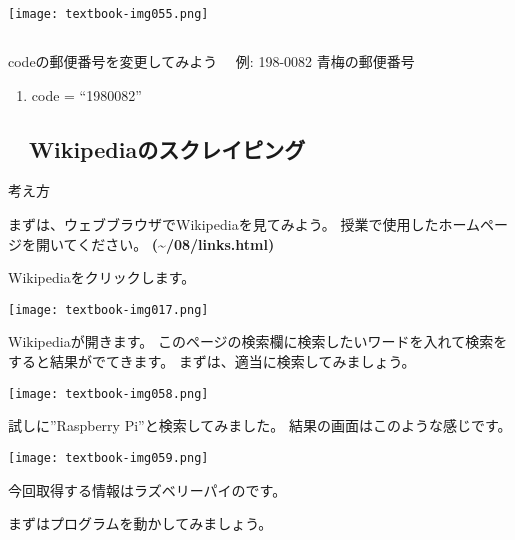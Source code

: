 \begin{center}
  \texttt{[image: textbook-img055.png]}
\end{center}

\subsection*{\theQuestion\label{Q:postNum}}
codeの郵便番号を変更してみよう
\ \ 例: 198-0082
青梅の郵便番号

\begin{center}
\begin{boxedminipage}{10.927cm}
\begin{enumerate}
\item code = “1980082”
\end{enumerate}
\end{boxedminipage}
\end{center}

\clearpage
\subsection*{\theExercise　Wikipediaのスクレイピング}
\addtocounter{Exercise}{-1}\label{E:wikipedia}
\noindent 考え方

まずは、ウェブブラウザでWikipediaを見てみよう。
授業で使用したホームページを開いてください。
\textbf{({\textasciitilde}/08/links.html)}

Wikipediaをクリックします。
\begin{center}
  \texttt{[image: textbook-img017.png]}
\end{center}

Wikipediaが開きます。
このページの検索欄に検索したいワードを入れて検索をすると結果がでてきます。
まずは、適当に検索してみましょう。
\begin{center}
  \texttt{[image: textbook-img058.png]}
\end{center}

\clearpage
試しに”Raspberry
Pi”と検索してみました。
結果の画面はこのような感じです。

\begin{center}
  \texttt{[image: textbook-img059.png]}
\end{center}
今回取得する情報はラズベリーパイのです。

まずはプログラムを動かしてみましょう。

